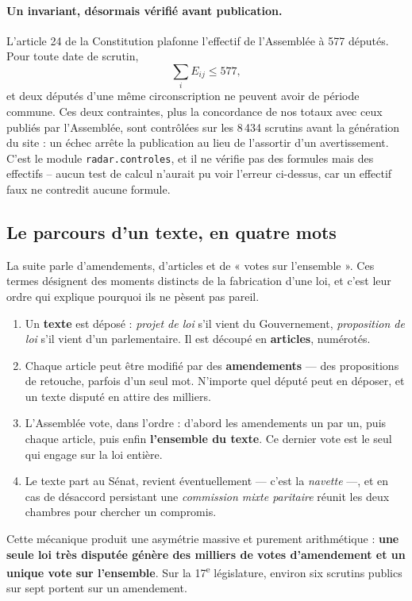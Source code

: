 \documentclass[11pt,a4paper]{article}
\newcommand{\code}[1]{\texttt{#1}}
\begin{document}
\paragraph{Un invariant, désormais vérifié avant publication.} L'article 24 de
la Constitution plafonne l'effectif de l'Assemblée à 577 députés. Pour toute
date de scrutin,
\[
 \sum_i E_{ij}\leq 577,
\]
et deux députés d'une même circonscription ne peuvent avoir de période commune.
Ces deux contraintes, plus la concordance de nos totaux avec ceux publiés par
l'Assemblée, sont contrôlées sur les 8\,434 scrutins avant la génération du
site : un échec arrête la publication au lieu de l'assortir d'un avertissement.
C'est le module \code{radar.controles}, et il ne vérifie pas des formules mais
des effectifs -- aucun test de calcul n'aurait pu voir l'erreur ci-dessus, car
un effectif faux ne contredit aucune formule.

\subsection{Le parcours d'un texte, en quatre mots}
\label{sec:parcours}

La suite parle d'amendements, d'articles et de « votes sur l'ensemble ». Ces
termes désignent des moments distincts de la fabrication d'une loi, et c'est
leur ordre qui explique pourquoi ils ne pèsent pas pareil.

\begin{enumerate}
  \item Un \textbf{texte} est déposé : \emph{projet de loi} s'il vient du
  Gouvernement, \emph{proposition de loi} s'il vient d'un parlementaire. Il est
  découpé en \textbf{articles}, numérotés.
  \item Chaque article peut être modifié par des \textbf{amendements} — des
  propositions de retouche, parfois d'un seul mot. N'importe quel député peut en
  déposer, et un texte disputé en attire des milliers.
  \item L'Assemblée vote, dans l'ordre : d'abord les amendements un par un, puis
  chaque article, puis enfin \textbf{l'ensemble du texte}. Ce dernier vote est le
  seul qui engage sur la loi entière.
  \item Le texte part au Sénat, revient éventuellement — c'est la
  \emph{navette} —, et en cas de désaccord persistant une \emph{commission mixte
  paritaire} réunit les deux chambres pour chercher un compromis.
\end{enumerate}

Cette mécanique produit une asymétrie massive et purement arithmétique :
\textbf{une seule loi très disputée génère des milliers de votes d'amendement
et un unique vote sur l'ensemble}. Sur la 17\textsuperscript{e} législature,
environ six scrutins publics sur sept portent sur un amendement.
\end{document}
